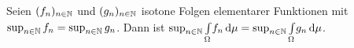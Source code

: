\documentclass{cheat-sheet}
\begin{document}
\begin{satz}
  Seien $(f_n)_{n \in \mathbb{N}}$ und $(g_n)_{n \in \mathbb{N}}$ isotone Folgen elementarer Funktionen mit $\sup_{n \in \mathbb{N}} f_n = \sup_{n \in \mathbb{N}} g_n$. Dann ist $\sup_{n \in \mathbb{N}} {\textstyle \int\limits_{\Omega}^{}} f_n \,\mathrm{d} \mu = \sup_{n \in \mathbb{N}} {\textstyle \int\limits_{\Omega}^{}} g_n \,\mathrm{d} \mu$.
\end{satz}


\end{document}
